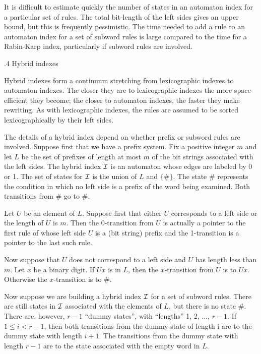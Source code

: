 It is difficult to estimate quickly the number of states in an
automaton index for a particular set of rules.  The total bit-length
of the left sides gives an upper bound, but this is frequently
pessimistic. The time needed to add a rule to an automaton index for a
set of subword rules is large compared to the time for a Rabin-Karp
index, particularly if subword rules are involved.

\bigskip
{}.4 Hybrid indexes

\nobreak

Hybrid indexes form a continuum stretching from lexicographic indexes
to automaton indexes.  The closer they are to lexicographic indexes
the more space-efficient they become; the closer to automaton indexes,
the faster they make rewriting.  As with lexicographic indexes, the
rules are assumed to be sorted lexicographically by their left sides.

The details of a hybrid index depend on whether prefix or subword
rules are involved.  Suppose first that we have a prefix system.  Fix
a positive integer $m$ and let $L$ be the set of prefixes of length at
most $m$ of the bit strings associated with the left sides.  The
hybrid index ${\cal I}$ is an automaton whose edges are labeled by 0
or 1.  The set of states for ${\cal I}$ is the union of $L$ and
$\{\#\}$.  The state \# represents the condition in which no left side
is a prefix of the word being examined.  Both transitions from \# go
to
\#.

Let $U$ be an element of $L$.  Suppose first that either $U$
corresponds to a left side or the length of $U$ is $m$.  Then the
0-transition from $U$ is actually a pointer to the first rule of whose
left side $U$ is a (bit string) prefix and the 1-transition is a
pointer to the last such rule.

Now suppose that $U$ does not correspond to a left side and $U$ has
length less than $m$.  Let $x$ be a binary digit.  If $Ux$ is in $L$,
then the $x$-transition from $U$ is to $Ux$.  Otherwise the
$x$-transition is to \#.


Now suppose we are building a hybrid index ${\cal I}$ for a set of
subword rules.  There are still states in ${\cal I}$ associated with
the elements of $L$, but there is no state \#.  There are, however,
$r-1$ ``dummy states'', with ``lengths'' 1, 2, ..., $r-1$.  If $1 \le
i < r-1$, then both transitions from the dummy state of length i are
to the dummy state with length $i+1$.  The transitions from the dummy
state with length $r-1$ are to the state associated with the empty
word in $L$.

